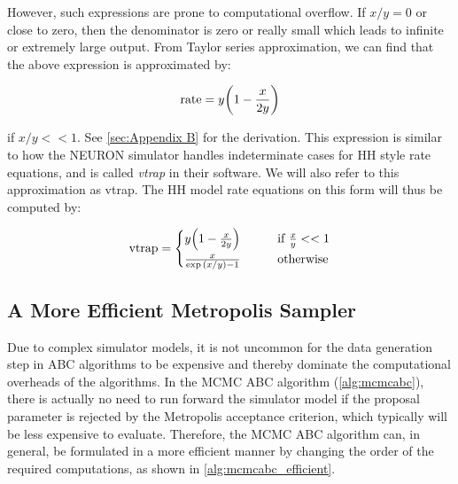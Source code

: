 However, such expressions are prone to computational overflow. If $x/y = 0$ or close to zero, then the denominator is zero or really small which leads to infinite or extremely large output. From Taylor series approximation, we can find that the above expression is approximated by:

\begin{equation*}
    \mathrm{rate} = y \qty(1 - \frac{x}{2y})
\end{equation*}

if $x/y << 1$. See \autoref{sec:Appendix B} for the derivation. This expression is similar to how the NEURON simulator \cite{neuron_book} handles indeterminate cases for HH style rate equations, and is called \textit{vtrap} in their software. We will also refer to this approximation as vtrap. The HH model rate equations on this form will thus be computed by:

\begin{equation}\label{eq:vtrap}
    \mathrm{vtrap} = \begin{cases}
    y \qty(1 - \frac{x}{2y}) \qquad &\text{if } \frac{x}{y} << 1
    \\
    \frac{x}{\exp \qty(x/y) - 1} \qquad &\text{otherwise}
    \end{cases}
\end{equation}

\subsection{A More Efficient Metropolis Sampler}

Due to complex simulator models, it is not uncommon for the data generation step in ABC algorithms to be expensive and thereby dominate the computational overheads of the algorithms. In the MCMC ABC algorithm (\cref{alg:mcmcabc}), there is actually no need to run forward the simulator model if the proposal parameter is rejected by the Metropolis acceptance criterion, which typically will be less expensive to evaluate. Therefore, the MCMC ABC algorithm can, in general, be formulated in a more efficient manner by changing the order of the required computations, as shown in \cref{alg:mcmcabc_efficient}. 

